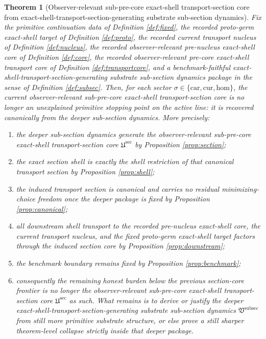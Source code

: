 \documentclass[11pt]{article}
\newcommand{\Car}{\mathrm{car}}
\newcommand{\Cur}{\mathrm{cur}}
\newcommand{\Hom}{\mathrm{hom}}
\newcommand{\SubPreSectionCore}{\mathfrak U^{\mathrm{sec}}}
\newcommand{\SubSectionPackage}{\mathfrak V^{\mathrm{subsec}}}
\newtheorem{theorem}{Theorem}
\begin{document}
\begin{theorem}[Observer-relevant sub-pre-core exact-shell transport-section core from exact-shell-transport-section-generating substrate sub-section dynamics]
\label{thm:main}
Fix the primitive continuation data of Definition \ref{def:fixed}, the recorded proto-germ exact-shell target of Definition \ref{def:proto}, the recorded current transport nucleus of Definition \ref{def:nucleus}, the recorded observer-relevant pre-nucleus exact-shell core of Definition \ref{def:core}, the recorded observer-relevant pre-core exact-shell transport core of Definition \ref{def:transportcore}, and a benchmark-faithful exact-shell-transport-section-generating substrate sub-section dynamics package in the sense of Definition \ref{def:subsec}. Then, for each sector \(\sigma\in\{\Car,\Cur,\Hom\}\), the current observer-relevant sub-pre-core exact-shell transport-section core is no longer an unexplained primitive stopping point on the active line: it is recovered canonically from the deeper sub-section dynamics. More precisely:
\begin{enumerate}
    \item the deeper sub-section dynamics generate the observer-relevant sub-pre-core exact-shell transport-section core \(\SubPreSectionCore\) by Proposition \ref{prop:section};
    \item the exact section shell is exactly the shell restriction of that canonical transport section by Proposition \ref{prop:shell};
    \item the induced transport section is canonical and carries no residual minimizing-choice freedom once the deeper package is fixed by Proposition \ref{prop:canonical};
    \item all downstream shell transport to the recorded pre-nucleus exact-shell core, the current transport nucleus, and the fixed proto-germ exact-shell target factors through the induced section core by Proposition \ref{prop:downstream};
    \item the benchmark boundary remains fixed by Proposition \ref{prop:benchmark};
    \item consequently the remaining honest burden below the previous section-core frontier is no longer the observer-relevant sub-pre-core exact-shell transport-section core \(\SubPreSectionCore\) as such. What remains is to derive or justify the deeper exact-shell-transport-section-generating substrate sub-section dynamics \(\SubSectionPackage\) from still more primitive substrate structure, or else prove a still sharper theorem-level collapse strictly inside that deeper package.
\end{enumerate}
\end{theorem}
\end{document}
